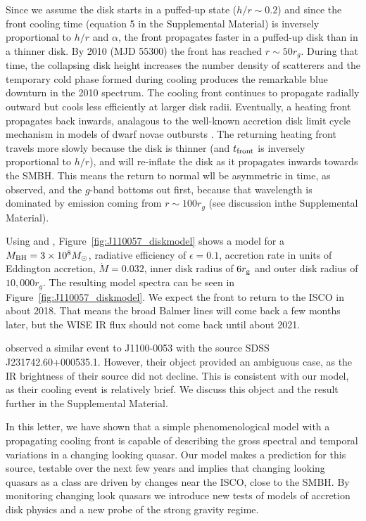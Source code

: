 \documentclass{nature}
\begin{document}
Since we assume the disk starts in a puffed-up state ($h/r \sim 0.2$)
and since the front cooling time (equation 5 in the Supplemental
Material) is inversely proportional to $h/r$ and $\alpha$, the front
propagates faster in a puffed-up disk than in a thinner disk. By 2010
(MJD 55300) the front has reached $r\sim50 r_{g}$. During that time,
the collapsing disk height increases the number density of scatterers
and the temporary cold phase formed during cooling produces the
remarkable blue downturn in the 2010 spectrum. The cooling front
continues to propagate radially outward but cools less efficiently at
larger disk radii. Eventually, a heating front propagates back
inwards, analagous to the well-known accretion disk limit cycle
mechanism in models of dwarf novae outbursts \cite[e.g.,
][]{Cannizzo1998}. The returning heating front travels more slowly
because the disk is thinner (and $t_{\rm front}$ is inversely
proportional to $h/r$), and will re-inflate the disk as it propagates
inwards towards the SMBH. This means the return to normal wll be
asymmetric in time, as observed, and the $g$-band bottoms out first,
because that wavelength is dominated by emission coming from
$r\sim100r_{g}$ (see discussion inthe Supplemental Material).

Using \cite{Ford2018} and \cite{Sirko_Goodman2003},
Figure~\ref{fig:J110057_diskmodel} shows a model for a $M_{\rm
BH}=3\times 10^{8} M_{\odot}$, radiative efficiency of $\epsilon=0.1$,
accretion rate in units of Eddington accretion, $\dot{M}=0.032$, inner
disk radius of $6r_{\rm g}$ and outer disk radius of $10,000 r_{g}$. The resulting model spectra can be seen in
Figure~\ref{fig:J110057_diskmodel}.  We expect the front to return to
the ISCO in about 2018. That means the broad Balmer lines will come back a few
months later, but the WISE IR flux should not come back until about
2021.

\cite{Guo2016} observed a similar event to J1100-0053 with the source
SDSS J231742.60+000535.1. However, their object provided an ambiguous
case, as the IR brightness of their source did not decline. This is consistent with our model, as their cooling event is
relatively brief.  We discuss this object and the \cite{Guo2016} result
further in the Supplemental Material. 

In this letter, we have shown that a simple phenomenological model
with a propagating cooling front is capable of describing the gross
spectral and temporal variations in a changing looking quasar. Our
model makes a prediction for this source, testable over the next few
years and implies that changing looking quasars as a class are driven
by changes near the ISCO, close to the SMBH. By monitoring changing
look quasars we introduce new tests of models of accretion disk
physics and a new probe of the strong gravity regime.
\end{document}
